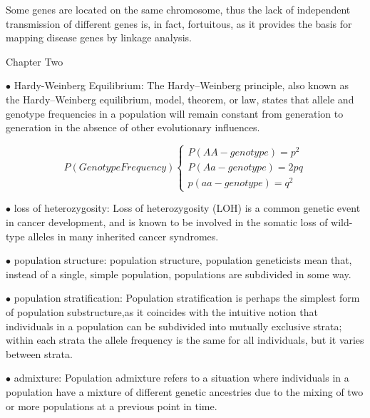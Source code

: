 \documentclass{article}
\begin{document}
Some genes are located on the same chromosome, thus the lack of independent transmission of different genes is, in fact, fortuitous, as it provides the basis for mapping disease genes by linkage analysis.




\newpage
\centerline{\sc Chapter Two}


\vspace{1pc}
$\bullet$ Hardy-Weinberg Equilibrium:
The Hardy–Weinberg principle, also known as the Hardy–Weinberg equilibrium, model, theorem, or law, states that allele and genotype frequencies in a population will remain constant from generation to generation in the absence of other evolutionary influences.



 \[
    P(Genotype Frequency)\left\{
                \begin{array}{ll}
                  P(AA - genotype) = p^{2}\\
                  P(Aa - genotype) = 2pq\\
                  p(aa - genotype) = q^{2}
                \end{array}
              \right.
  \]


\vspace{1pc}
$\bullet$ loss of heterozygosity:
Loss of heterozygosity (LOH) is a common genetic event in cancer development, and is known to be involved in the somatic loss of wild-type alleles in many inherited cancer syndromes.

\vspace{1pc}
$\bullet$ population structure:
population structure, population geneticists mean that, instead of a single, simple population, populations are subdivided in some way.

\vspace{1pc}
$\bullet$ population stratification:
Population stratification is perhaps the simplest form of population substructure,as it coincides with the intuitive notion that individuals in a population can be subdivided into mutually exclusive strata; within each strata the allele frequency is the same for all individuals, but it varies between strata.


\vspace{1pc}
$\bullet$ admixture:
Population admixture refers to a situation where individuals in a population have a mixture of different genetic ancestries due to the mixing of two or more populations at a previous point in time.
\end{document}
